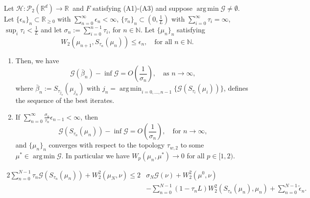 \documentclass[10pt,a4paper]{amsart}
\DeclareMathOperator*{\argmin}{arg\,min}
\newcommand{\N}{\mathbb{N}}
\newcommand{\R}{\mathbb{R}}
\newcommand{\cG}{\mathcal{G}}
\newcommand{\cP}{\mathcal{P}}
\newcommand{\cT}{S}
\begin{document}
\begin{theorem}\label{thm:PG_convergence1}
	Let $\mathcal{H} : \cP_2(\R^d) \to \mathbb{R} \ $ and $F$ satisfying (A1)-(A3) and suppose $\argmin \cG \neq \emptyset$. Let $\{\epsilon_n\}_n\subset \mathbb{R}_{\geq 0}$ with $\sum_{n=0}^{\infty} \epsilon_n < \infty$, $\{\tau_n\}_n \subset \left(0,\frac{1}{L}\right)$ with $\sum_{i=0}^{\infty}\tau_i= \infty$, $\sup_i \tau_i < \frac{1}{L}$ and let $\sigma_n:= \sum_{i=0}^{n-1}\tau_i$, for $n\in\mathbb{N}$. Let $\{\mu_n\}_n$ satisfying
	\[W_2(\mu_{n+1},\cT_{\tau_n}(\mu_n))\leq \epsilon_n, \quad \text{for all } n \in \N.\]
	\begin{enumerate}
		\item Then, we have
		\begin{equation}\label{eq:rate_PG_bar1}
			\cG(\bar \beta_n)-\inf \cG = O\left(\frac{1}{\sigma_n}\right), \quad \text{as } n\to \infty,
		\end{equation}
		where $\bar \beta_n := \cT_{\tau_{j_n}}(\mu_{j_n})$ with $j_n = \argmin_{i=0,\dots,n-1}\{\cG(\cT_{\tau_i}(\mu_i))\}$, defines the sequence of the best iterates.
		\item If $\sum_{n=0}^{\infty}\frac{\sigma_n}{\tau_n}\epsilon_{n-1}  < \infty$, then \[\cG(\cT_{\tau_n}(\mu_n))-\inf \cG = O\left(\frac{1}{\sigma_n}\right), \quad \text{for } n\to \infty,\] and $\{\mu_n\}_n$ converges with respect to the topology $\tau_{w,2}$ to some $\mu^*\in \argmin \cG$. In particular we have $W_p(\mu_n,\mu^*)\to 0$ for all $p\in[1,2)$.
	\end{enumerate}
\end{theorem}

	\begin{equation}\label{eq:for_rates1_PG}
		\begin{aligned}
			2\sum_{n=0}^{N-1}\tau_n\cG(\cT_{\tau_n}(\mu_n))+W_2^2(\mu_N,\nu)\leq 2&\sigma_N \cG(\nu)+W_2^2(\mu^0,\nu)\\
			&-\sum_{n=0}^{N-1}(1-\tau_n L)W_2^2(\cT_{\tau_n}(\mu_n),\mu_n)+\sum_{n=0}^{N-1}\tilde{\epsilon}_n.
		\end{aligned}
	\end{equation}
\end{document}
